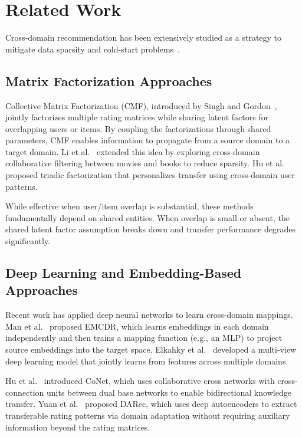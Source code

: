\documentclass[conference]{IEEEtran}
\begin{document}
\section{Related Work}

Cross-domain recommendation has been extensively studied as a strategy to mitigate data sparsity and cold-start problems~\cite{cantador2015, zhu2021, khan2017}.

\subsection{Matrix Factorization Approaches}

Collective Matrix Factorization (CMF), introduced by Singh and Gordon~\cite{singh2008}, jointly factorizes multiple rating matrices while sharing latent factors for overlapping users or items. By coupling the factorizations through shared parameters, CMF enables information to propagate from a source domain to a target domain. Li et al.~\cite{li2009} extended this idea by exploring cross-domain collaborative filtering between movies and books to reduce sparsity. Hu et al.~\cite{hu2013} proposed triadic factorization that personalizes transfer using cross-domain user patterns.

While effective when user/item overlap is substantial, these methods fundamentally depend on shared entities. When overlap is small or absent, the shared latent factor assumption breaks down and transfer performance degrades significantly.

\subsection{Deep Learning and Embedding-Based Approaches}

Recent work has applied deep neural networks to learn cross-domain mappings. Man et al.~\cite{man2017} proposed EMCDR, which learns embeddings in each domain independently and then trains a mapping function (e.g., an MLP) to project source embeddings into the target space. Elkahky et al.~\cite{elkahky2015} developed a multi-view deep learning model that jointly learns from features across multiple domains.

Hu et al.~\cite{hu2018} introduced CoNet, which uses collaborative cross networks with cross-connection units between dual base networks to enable bidirectional knowledge transfer. Yuan et al.~\cite{yuan2019} proposed DARec, which uses deep autoencoders to extract transferable rating patterns via domain adaptation without requiring auxiliary information beyond the rating matrices.
\end{document}
